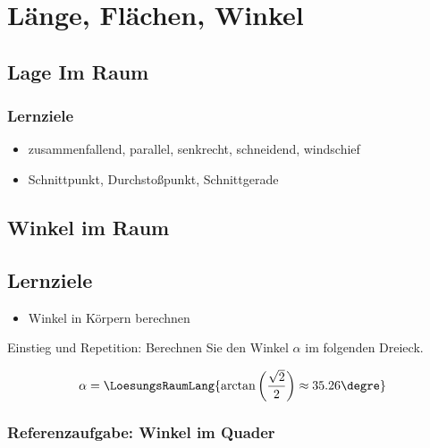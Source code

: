 \section{Länge, Flächen, Winkel}


\subsection{Lage Im Raum}

\subsubsection*{Lernziele}
\begin{itemize}
\item zusammenfallend, parallel, senkrecht, schneidend, windschief
\item Schnittpunkt, Durchstoßpunkt, Schnittgerade 
\end{itemize}

\newpage


\subsection{Winkel im Raum}


\subsection*{Lernziele}
\begin{itemize}
\item Winkel in Körpern berechnen
\end{itemize}


Einstieg und Repetition: Berechnen Sie den Winkel $\alpha$ im folgenden Dreieck.


$$\alpha= \LoesungsRaumLang{ \arctan\left(\frac{\sqrt2}2\right) \approx 35.26\degre  }$$

\newpage

\subsubsection{Referenzaufgabe: Winkel im Quader}

